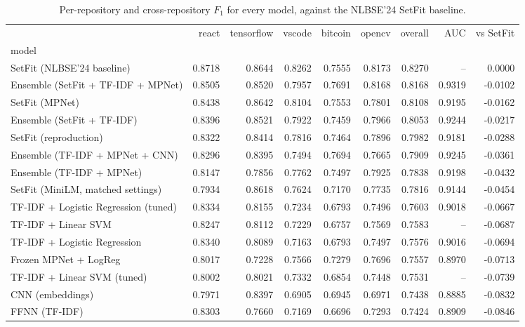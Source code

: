 \begin{table}[htbp]
  \centering
  \caption{Per-repository and cross-repository $F_1$ for every model, against the NLBSE'24 SetFit baseline.}
  \label{tab:final-leaderboard}
\begin{tabular}{lrrrrrrrr}
\toprule
 & react & tensorflow & vscode & bitcoin & opencv & overall & AUC & vs SetFit \\
model &  &  &  &  &  &  &  &  \\
\midrule
SetFit (NLBSE'24 baseline) & 0.8718 & 0.8644 & 0.8262 & 0.7555 & 0.8173 & 0.8270 & -- & 0.0000 \\
Ensemble (SetFit + TF-IDF + MPNet) & 0.8505 & 0.8520 & 0.7957 & 0.7691 & 0.8168 & 0.8168 & 0.9319 & -0.0102 \\
SetFit (MPNet) & 0.8438 & 0.8642 & 0.8104 & 0.7553 & 0.7801 & 0.8108 & 0.9195 & -0.0162 \\
Ensemble (SetFit + TF-IDF) & 0.8396 & 0.8521 & 0.7922 & 0.7459 & 0.7966 & 0.8053 & 0.9244 & -0.0217 \\
SetFit (reproduction) & 0.8322 & 0.8414 & 0.7816 & 0.7464 & 0.7896 & 0.7982 & 0.9181 & -0.0288 \\
Ensemble (TF-IDF + MPNet + CNN) & 0.8296 & 0.8395 & 0.7494 & 0.7694 & 0.7665 & 0.7909 & 0.9245 & -0.0361 \\
Ensemble (TF-IDF + MPNet) & 0.8147 & 0.7856 & 0.7762 & 0.7497 & 0.7925 & 0.7838 & 0.9198 & -0.0432 \\
SetFit (MiniLM, matched settings) & 0.7934 & 0.8618 & 0.7624 & 0.7170 & 0.7735 & 0.7816 & 0.9144 & -0.0454 \\
TF-IDF + Logistic Regression (tuned) & 0.8334 & 0.8155 & 0.7234 & 0.6793 & 0.7496 & 0.7603 & 0.9018 & -0.0667 \\
TF-IDF + Linear SVM & 0.8247 & 0.8112 & 0.7229 & 0.6757 & 0.7569 & 0.7583 & -- & -0.0687 \\
TF-IDF + Logistic Regression & 0.8340 & 0.8089 & 0.7163 & 0.6793 & 0.7497 & 0.7576 & 0.9016 & -0.0694 \\
Frozen MPNet + LogReg & 0.8017 & 0.7228 & 0.7566 & 0.7279 & 0.7696 & 0.7557 & 0.8970 & -0.0713 \\
TF-IDF + Linear SVM (tuned) & 0.8002 & 0.8021 & 0.7332 & 0.6854 & 0.7448 & 0.7531 & -- & -0.0739 \\
CNN (embeddings) & 0.7971 & 0.8397 & 0.6905 & 0.6945 & 0.6971 & 0.7438 & 0.8885 & -0.0832 \\
FFNN (TF-IDF) & 0.8303 & 0.7660 & 0.7169 & 0.6696 & 0.7293 & 0.7424 & 0.8909 & -0.0846 \\

\end{tabular}
\end{table}
